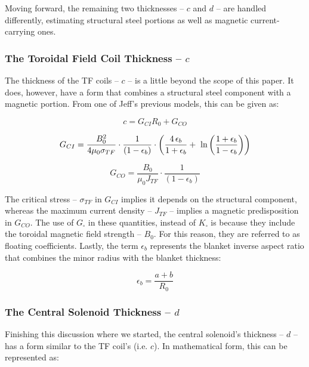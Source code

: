 Moving forward, the remaining two thicknesses -- $c$ and $d$ -- are handled differently, estimating structural steel portions as well as magnetic current-carrying ones.

\subsubsection{The Toroidal Field Coil Thickness -- $c$}

The thickness of the TF coils -- $c$ -- is a little beyond the scope of this paper. It does, however, have a form that combines a structural steel component with a magnetic portion. From one of Jeff's previous models, this can be given as: \cite{minervini}

\begin{equation}
	\label{eq:cc}
	c = G_{CI} R_0 + G_{CO}
\end{equation}

\begin{equation}
	G_{CI} = \frac{B_{0}^2}{ 4 \mu_0 \sigma_{TF} } \cdot \frac{1}{ ( 1 - \epsilon_b )}  \cdot \left( \frac{ 4 \, \epsilon_b}{1+\epsilon_b} + \ \textnormal{ln} \left( \frac{1+\epsilon_b}{1-\epsilon_b} \right) \right) 
\end{equation}

\begin{equation}
	G_{CO} = \frac{B_{0}}{ \mu_0 J_{TF} } \cdot \frac{1}{ ( 1 - \epsilon_b )}
\end{equation}

The critical stress -- $\sigma_{TF}$ in $G_{CI}$ implies it depends on the structural component, whereas the maximum current density -- $J_{TF}$ -- implies a magnetic predisposition in $G_{CO}$. The use of $G_\square$ in these quantities, instead of $K_\square$ is because they include the toroidal magnetic field strength -- $B_0$. For this reason, they are referred to as floating coefficients. Lastly, the term $\epsilon_b$ represents the blanket inverse aspect ratio that combines the minor radius with the blanket thickness:

\begin{equation}
	\epsilon_b = \frac{ a + b }{R_0}
\end{equation}

\subsubsection{The Central Solenoid Thickness -- $d$}

Finishing this discussion where we started, the central solenoid's thickness -- $d$ -- has a form similar to the TF coil's (i.e. $c$). In mathematical form, this can be represented as: \cite{minervini}

